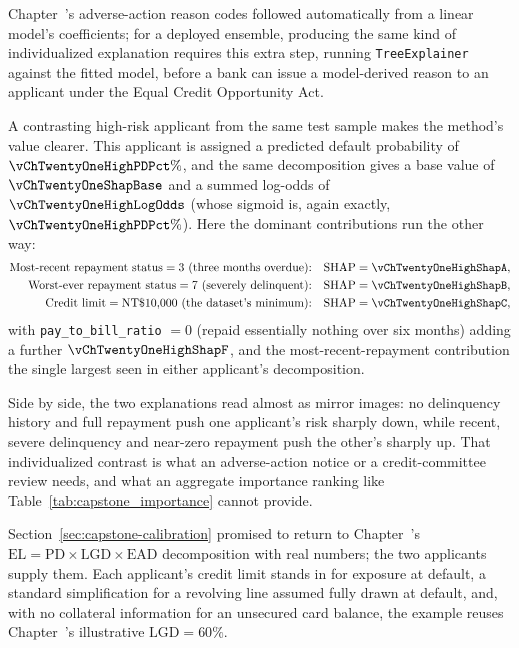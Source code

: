\documentclass[../ai_in_finance]{subfiles}
\begin{document}
Chapter~'s adverse-action reason codes followed automatically from a linear model's coefficients; for a deployed ensemble, producing the same kind of individualized explanation requires this extra step, running \texttt{TreeExplainer} against the fitted model, before a bank can issue a model-derived reason to an applicant under the Equal Credit Opportunity Act.

A contrasting high-risk applicant from the same test sample makes the method's value clearer. This applicant is assigned a predicted default probability of $\vChTwentyOneHighPDPct\%$, and the same decomposition gives a base value of $\vChTwentyOneShapBase$ and a summed log-odds of $\vChTwentyOneHighLogOdds$ (whose sigmoid is, again exactly, $\vChTwentyOneHighPDPct\%$). Here the dominant contributions run the other way:
\begin{align*}
\text{Most-recent repayment status} = 3 \text{ (three months overdue):} &\quad \text{SHAP} = \vChTwentyOneHighShapA, \\
\text{Worst-ever repayment status} = 7 \text{ (severely delinquent):} &\quad \text{SHAP} = \vChTwentyOneHighShapB, \\
\text{Credit limit} = \text{NT}\$10{,}000 \text{ (the dataset's minimum):} &\quad \text{SHAP} = \vChTwentyOneHighShapC,
\end{align*}
with \texttt{pay\_to\_bill\_ratio} $= 0$ (repaid essentially nothing over six months) adding a further $\vChTwentyOneHighShapF$, and the most-recent-repayment contribution the single largest seen in either applicant's decomposition.

Side by side, the two explanations read almost as mirror images: no delinquency history and full repayment push one applicant's risk sharply down, while recent, severe delinquency and near-zero repayment push the other's sharply up. That individualized contrast is what an adverse-action notice or a credit-committee review needs, and what an aggregate importance ranking like Table~\ref{tab:capstone_importance} cannot provide.


Section~\ref{sec:capstone-calibration} promised to return to Chapter~'s $\text{EL} = \text{PD} \times \text{LGD} \times \text{EAD}$ decomposition with real numbers; the two applicants supply them. Each applicant's credit limit stands in for exposure at default, a standard simplification for a revolving line assumed fully drawn at default, and, with no collateral information for an unsecured card balance, the example reuses Chapter~'s illustrative $\text{LGD}=60\%$.
\end{document}
